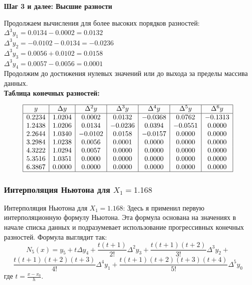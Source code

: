 \documentclass{article}
\begin{document}
                  \textbf{Шаг 3 и далее: Высшие разности}

                  Продолжаем вычисления для более высоких порядков разностей:
                  \\   
                  \(\Delta^3 y_1 = 0.0134 - 0.0002 = 0.0132\) \\
                  \(\Delta^3 y_2 = -0.0102 - 0.0134 = -0.0236\) \\
                  \(\Delta^3 y_3 = 0.0056 + 0.0102 = 0.0158\) \\
                  \(\Delta^3 y_4 = 0.0057 - 0.0056 = 0.0001\) \\

                  Продолжим до достижения нулевых значений или до выхода за пределы массива данных.
                  \\
                  \textbf{Таблица конечных разностей:}
 
                  \[
                  \begin{array}{|c|c|c|c|c|c|c|c|}
                  \hline
                  y & \Delta y & \Delta^2 y & \Delta^3 y & \Delta^4 y & \Delta^5 y & \Delta^6 y \\
                  \hline
                  0.2234 & 1.0204 & 0.0002 & 0.0132 & -0.0368 & 0.0762 & -0.1313 \\
                  1.2438 & 1.0206 & 0.0134 & -0.0236 & 0.0394 & -0.0551 & 0.0000 \\
                  2.2644 & 1.0340 & -0.0102 & 0.0158 & -0.0157 & 0.0000 & 0.0000 \\
                  3.2984 & 1.0238 & 0.0056 & 0.0001 & 0.0000 & 0.0000 & 0.0000 \\
                  4.3222 & 1.0294 & 0.0057 & 0.0000 & 0.0000 & 0.0000 & 0.0000 \\
                  5.3516 & 1.0351 & 0.0000 & 0.0000 & 0.0000 & 0.0000 & 0.0000 \\
                  6.3867 & 0.0000 & 0.0000 & 0.0000 & 0.0000 & 0.0000 & 0.0000 \\
                  \hline
                  \end{array}
                  \]
            \subsubsection{Интерполяция Ньютона для \( X_1 = 1.168 \)}
                  Интерполяция Ньютона для \( X_1 = 1.168 \): Здесь я применил первую интерполяционную формулу Ньютона. Эта формула основана на значениях в начале списка данных и подразумевает использование прогрессивных конечных разностей. Формула выглядит так:
                  $$
                  N_5(x) = y_5 + t\Delta y_4 + \frac{t(t+1)}{2!}\Delta^2 y_3 + \frac{t(t+1)(t+2)}{3!}\Delta^3 y_2 +
                  $$
                  $$\frac{t(t+1)(t+2)(t+3)}{4!}\Delta^4 y_1 + \frac{t(t+1)(t+2)(t+3)(t+4)}{5!}\Delta^5 y_0$$
                  где \( t = \frac{x - x_0}{h} \).
                  
\end{document}
